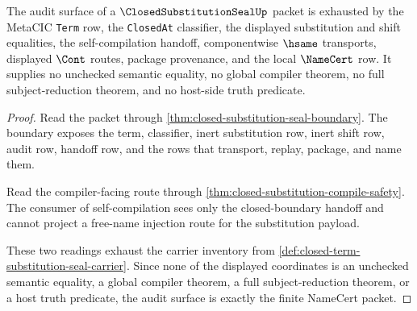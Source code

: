 \begin{theorem}
\label{thm:closed-substitution-audit-surface}
The audit surface of a $\ClosedSubstitutionSealUp$ packet is exhausted by the MetaCIC \texttt{Term} row, the \texttt{ClosedAt} classifier, the displayed substitution and shift equalities, the self-compilation handoff, componentwise $\hsame$ transports, displayed $\Cont$ routes, package provenance, and the local $\NameCert$ row. It supplies no unchecked semantic equality, no global compiler theorem, no full subject-reduction theorem, and no host-side truth predicate.
\end{theorem}
\begin{proof}
Read the packet through \autoref{thm:closed-substitution-seal-boundary}. The boundary exposes the term, classifier, inert substitution row, inert shift row, audit row, handoff row, and the rows that transport, replay, package, and name them.

Read the compiler-facing route through \autoref{thm:closed-substitution-compile-safety}. The consumer of self-compilation sees only the closed-boundary handoff and cannot project a free-name injection route for the substitution payload.

These two readings exhaust the carrier inventory from \autoref{def:closed-term-substitution-seal-carrier}. Since none of the displayed coordinates is an unchecked semantic equality, a global compiler theorem, a full subject-reduction theorem, or a host truth predicate, the audit surface is exactly the finite NameCert packet.
\end{proof}

